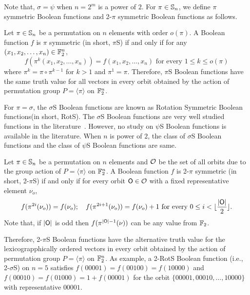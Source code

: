 \documentclass{llncs}
\begin{document}
Note that, $\sigma = \psi$ when $n = 2^m$ is a power of $2$.
For $\pi\in \mathbb{S}_n$, we define $\pi$ symmetric Boolean functions and 2-$\pi$ symmetric Boolean functions as follows.
\begin{definition}\label{def:PSBF}
Let $\pi \in \mathbb{S}_n$ be a permutation on $n$ elements with order $o(\pi)$.
A Boolean function $f$ is $\pi$ symmetric (in short, $\pi$S) if and only if for any $(x_1,x_2,\ldots,x_n)\in \mathbb{F}_2^n$, $$f(\pi^k(x_1,x_2,\ldots,x_n))= f(x_1,x_2,\ldots,x_n) \text{ for every } 1 \leq k \leq o(\pi)$$ where $\pi^k = \pi \circ \pi^{k-1}$ for $k > 1$ and $\pi^1 = \pi$.
Therefore, $\pi$S Boolean functions have the same truth value for all vectors in every orbit obtained by the action of permutation group $P = \langle \pi \rangle$ on $\mathbb{F}_2^n$. 
\end{definition}
For $\pi = \sigma$, the $\sigma$S Boolean functions are known as Rotation Symmetric Boolean functions(in short, RotS). The $\sigma$S Boolean functions are very well studied functions in the literature~\cite{JUSC:PQ99,DM:CS02,DAM:SM08}. However, no study on $\psi$S Boolean functions is available in the literature. When $n$ is power of $2$, the class of $\sigma$S Boolean functions and the class of $\psi$S Boolean functions are same.

\begin{definition}\label{def:2PSBF}
Let $\pi \in \mathbb{S}_n$ be a permutation on $n$ elements and $\mathcal{O}$ be the set of all orbits due to the group action of $P = \langle \pi \rangle$ on $\mathbb{F}_2^n$.
A Boolean function $f$ is 2-$\pi$ symmetric (in short, 2-$\pi$S) if and only if for every orbit $\mathsf{O} \in \mathcal{O}$ with a fixed representative element $\nu_o$,
$$f(\pi^{2i}(\nu_o)) = f(\nu_o);~~~ f(\pi^{2i+1}(\nu_o)) = f(\nu_o)+1 \text{ for every } 0 \leq i < \lfloor\frac{|\mathsf{O}|}{2}\rfloor.$$
Note that, if $|\mathsf{O}|$ is odd then $f(\pi^{|\mathsf{O}|-1}(\nu))$ can be any value from $\mathbb{F}_2$.
\end{definition}
Therefore, 2-$\pi$S Boolean functions have the alternative truth value for the lexicograpphically ordered vectors in every orbit obtained by the action of permutation group $P = \langle \pi \rangle$ on $\mathbb{F}_2^n$. 
As example, a 2-RotS Boolean function (i.e., 2-$\sigma$S) on $n = 5$ satisfies $f(00001) = f(00100) = f(10000)$ and $f(00010) = f(01000) = 1+f(00001)$ for the orbit $\{00001, 00010, \ldots, 10000\}$ with representative  $00001$.
\end{document}
